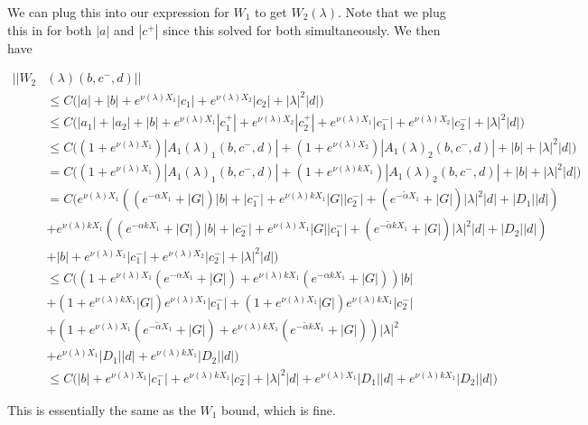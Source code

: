 \documentclass[12pt]{article}
\begin{document}
\begin{enumerate}
We can plug this into our expression for $W_1$ to get $W_2(\lambda)$. Note that we plug this in for both $|a|$ and $|c^+|$ since this solved for both simultaneously. We then have

\begin{align*}
||W_2&(\lambda)(b,c^-,d)|| \\
&\leq C \Big(|a| + |b| + e^{\nu(\lambda)X_1}|c_1| + e^{\nu(\lambda)X_2}|c_2| + |\lambda|^2 |d| \Big) \\
&\leq C \Big(|a_1| + |a_2| + |b| + e^{\nu(\lambda)X_1}|c_1^+| + e^{\nu(\lambda)X_2}|c_2^+| + e^{\nu(\lambda)X_1}|c_1^-| + e^{\nu(\lambda)X_2}|c_2^-| + |\lambda|^2 |d| \Big) \\
&\leq C \Big( (1 + e^{\nu(\lambda)X_1}) |A_1(\lambda)_1(b, c^-, d)| + (1 + e^{\nu(\lambda)X_2})|A_1(\lambda)_2(b, c^-, d)| + |b| + |\lambda|^2 |d| \Big)\\
&= C \Big( (1 + e^{\nu(\lambda)X_1}) |A_1(\lambda)_1(b, c^-, d)| + (1 + e^{\nu(\lambda)k X_1 })|A_1(\lambda)_2(b, c^-, d)| + |b| + |\lambda|^2 |d| \Big)\\
&= C \Big( e^{\nu(\lambda)X_1} ((e^{-\alpha X_1} + |G|) |b| + |c_1^-| + e^{\nu(\lambda)k X_1} |G||c_2^-| + (e^{-\tilde{\alpha} X_1} + |G|) |\lambda|^2 |d| + |D_1||d| )\\
&+ e^{\nu(\lambda)k X_1} ((e^{-\alpha k X_1} + |G|) |b| + |c_2^-| + e^{\nu(\lambda) X_1} |G||c_1^-| + (e^{-\tilde{\alpha} k X_1} + |G|) |\lambda|^2 |d| + |D_2||d| )\\
&+ |b| + e^{\nu(\lambda)X_1}|c_1^-| + e^{\nu(\lambda)X_2}|c_2^-| + |\lambda|^2 |d| \Big) \\
&\leq C\Big( (1 + e^{\nu(\lambda)X_1} (e^{-\alpha X_1} + |G|) + e^{\nu(\lambda)k X_1} (e^{-\alpha k X_1} + |G|)) |b|\\
&+ ( 1 + e^{\nu(\lambda)k X_1} |G|) e^{\nu(\lambda)X_1}|c_1^-|
+ ( 1 + e^{\nu(\lambda) X_1} |G|) e^{\nu(\lambda)k X_1}|c_2^-|\\
&+( 1 + e^{\nu(\lambda)X_1}(e^{-\tilde{\alpha} X_1} + |G|)  + e^{\nu(\lambda)k X_1} (e^{-\tilde{\alpha} k X_1} + |G|)) |\lambda|^2 \\
&+ e^{\nu(\lambda)X_1}|D_1||d| + e^{\nu(\lambda)k X_1}|D_2||d| \Big)\\
&\leq C\Big( |b| + e^{\nu(\lambda) X_1} |c_1^-| +  e^{\nu(\lambda) k X_1} |c_2^-| + |\lambda|^2 |d| + e^{\nu(\lambda) X_1} |D_1| |d| + e^{\nu(\lambda) k X_1} |D_2| |d| \Big)
\end{align*}

This is essentially the same as the $W_1$ bound, which is fine.\\


\end{enumerate}
\end{document}
